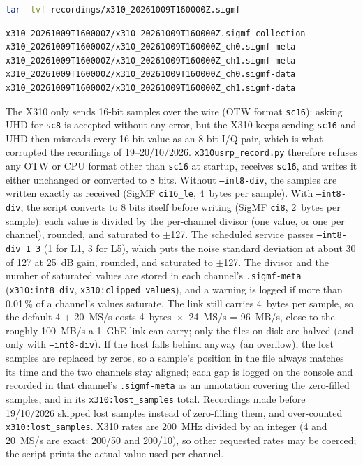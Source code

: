 \documentclass[11pt,a4paper]{article}
\begin{document}
\begin{lstlisting}[language=bash]
tar -tvf recordings/x310_20261009T160000Z.sigmf
\end{lstlisting}

\begin{lstlisting}
x310_20261009T160000Z/x310_20261009T160000Z.sigmf-collection
x310_20261009T160000Z/x310_20261009T160000Z_ch0.sigmf-meta
x310_20261009T160000Z/x310_20261009T160000Z_ch1.sigmf-meta
x310_20261009T160000Z/x310_20261009T160000Z_ch0.sigmf-data
x310_20261009T160000Z/x310_20261009T160000Z_ch1.sigmf-data
\end{lstlisting}

The X310 only sends 16-bit samples over the wire (OTW format \texttt{sc16}): asking UHD for \texttt{sc8} is accepted without any error, but the X310 keeps sending \texttt{sc16} and UHD then misreads every 16-bit value as an 8-bit I/Q pair, which is what corrupted the recordings of 19--20/10/2026. \texttt{x310usrp\_record.py} therefore refuses any OTW or CPU format other than \texttt{sc16} at startup, receives \texttt{sc16}, and writes it either unchanged or converted to 8 bits. Without \texttt{--int8-div}, the samples are written exactly as received (SigMF \texttt{ci16\_le}, 4~bytes per sample). With \texttt{--int8-div}, the script converts to 8 bits itself before writing (SigMF \texttt{ci8}, 2~bytes per sample): each value is divided by the per-channel divisor (one value, or one per channel), rounded, and saturated to $\pm$127. The scheduled service passes \texttt{--int8-div 1 3} (1 for L1, 3 for L5), which puts the noise standard deviation at about 30 of 127 at 25~dB gain, rounded, and saturated to $\pm$127. The divisor and the number of saturated values are stored in each channel's \texttt{.sigmf-meta} (\texttt{x310:int8\_div}, \texttt{x310:clipped\_values}), and a warning is logged if more than 0.01\,\% of a channel's values saturate. The link still carries 4~bytes per sample, so the default 4 + 20~MS/s costs 4~bytes~$\times$~24~MS/s = 96~MB/s, close to the roughly 100~MB/s a 1~GbE link can carry; only the files on disk are halved (and only with \texttt{--int8-div}). If the host falls behind anyway (an overflow), the lost samples are replaced by zeros, so a sample's position in the file always matches its time and the two channels stay aligned; each gap is logged on the console and recorded in that channel's \texttt{.sigmf-meta} as an annotation covering the zero-filled samples, and in its \texttt{x310:lost\_samples} total. Recordings made before 19/10/2026 skipped lost samples instead of zero-filling them, and over-counted \texttt{x310:lost\_samples}. X310 rates are 200~MHz divided by an integer (4 and 20~MS/s are exact: 200/50 and 200/10), so other requested rates may be coerced; the script prints the actual value used per channel.
\end{document}
